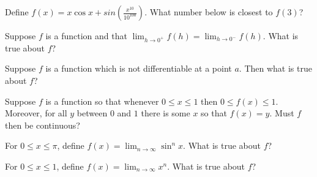 \documentclass{ximera}
\begin{document}
\begin{problem}
  Define $f(x) = x \cos x + sin\left(\frac{x^{10}}{10^{100}}\right)$.  What number below is closest to $f(3)$?
  \begin{multipleChoice}
  \end{multipleChoice}
\end{problem}

\begin{problem}
  Suppose $f$ is a function and that $\lim_{h \to 0^{+}} f(h) = \lim_{h \to 0^{-}} f(h)$.  What is true about $f$?
  \begin{multipleChoice}
  \end{multipleChoice}
\end{problem}

\begin{problem}
  Suppose $f$ is a function which is not differentiable at a point $a$.  Then what is true about $f$?
  \begin{multipleChoice}
  \end{multipleChoice}
\end{problem}

\begin{problem}
  Suppose $f$ is a function so that whenever $0 \leq x \leq 1$ then
  $0 \leq f(x) \leq 1$.  Moreover, for all $y$ between $0$ and $1$
  there is some $x$ so that $f(x) = y$.  Must $f$ then be continuous?
  \begin{multipleChoice}
  \end{multipleChoice}
\end{problem}

\begin{problem}
  For $0 \leq x \leq \pi$, define
  $f(x) = \lim_{n \to \infty} \sin^n x$.  What is true about $f$?
  \begin{multipleChoice}
  \end{multipleChoice}
\end{problem}

\begin{problem}
  For $0 \leq x \leq 1$, define
  $f(x) = \lim_{n \to \infty} x^n$.  What is true about $f$?
  \begin{multipleChoice}
  \end{multipleChoice}
\end{problem}
\end{document}

